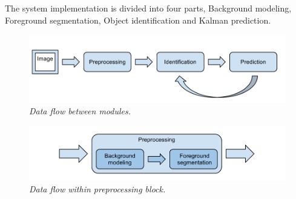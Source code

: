 The system implementation is divided into four parts, Background modeling, Foreground segmentation, Object identification and Kalman prediction.

\begin{figure}[htb]
	\centering
	\includegraphics[width=\linewidth]{images/data_flow.png}
	\caption{\textit{Data flow between modules.}}
	\label{fig:block_overview_fig}  %
\end{figure}

\begin{figure}[htb]
	\centering
	\includegraphics[width=\linewidth]{images/data_flow_preprocessing.png}
	\caption{\textit{Data flow within preprocessing block.}}
	\label{fig:block_overview2_fig}  %
\end{figure}

